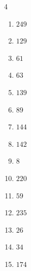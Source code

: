 \begin{multicols}{4}
\begin{enumerate}

  \item $249$


  \item $129$


  \item $61$


\columnbreak %

\resetques

  \item $63$


  \item $139$


  \item $89$


  \item $144$


  \item $142$


  \item $8$


  \item $220$


  \item $59$


  \item $235$


  \item $26$


  \item $34$


  \item $174$


\end{enumerate}
\end{multicols}
